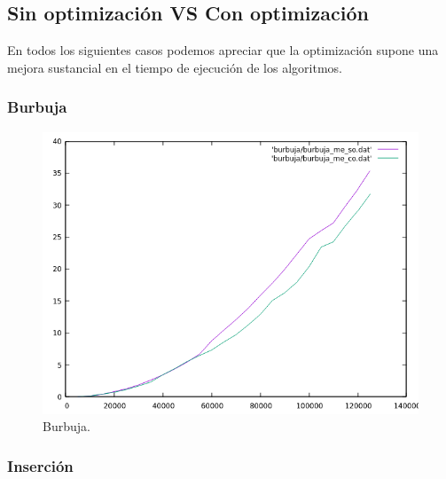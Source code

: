 \documentclass[a4paper,12pt,twoside]{article} %
\begin{document}
\newpage
	
	\subsection{Sin optimización VS Con optimización}
	
	En todos los siguientes casos podemos apreciar que la optimización supone una mejora sustancial en el tiempo de ejecución de los algoritmos.
	
	
	\subsubsection{Burbuja}
	
\begin{figure}[h]
  \begin{center}
  
  	\includegraphics[scale=0.8]{comparacion_bb.png}
  	\caption{Burbuja.}
  	
  \end{center}
\end{figure}

\newpage

	\subsubsection{Inserción}
\end{document}
